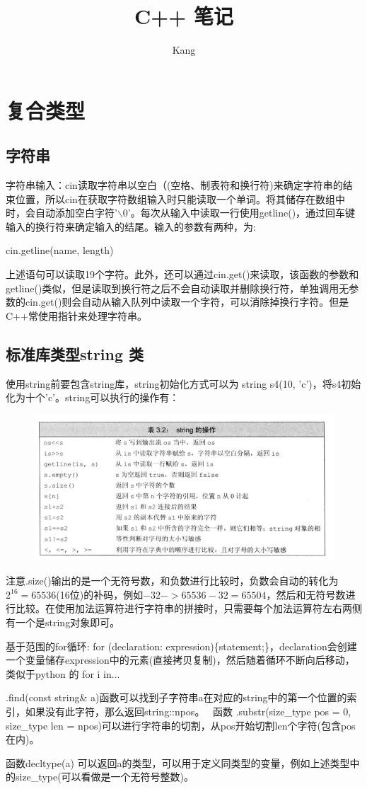 \documentclass[]{article}
\title{C++ 笔记}
\author{Kang}
\begin{document}
\maketitle
\section{复合类型}
\subsection{字符串}
    \par 字符串输入：cin读取字符串以空白（(空格、制表符和换行符)来确定字符串的结束位置，所以cin在获取字符数组输入时只能读取一个单词。将其储存在数组中时，会自动添加空白字符'$\backslash$0'。每次从输入中读取一行使用getline()，通过回车键输入的换行符来确定输入的结尾。输入的参数有两种，为:  \begin{center}
    	cin.getline(name, length)
    \end{center}
    
    上述语句可以读取19个字符。此外，还可以通过cin.get()来读取，该函数的参数和getline()类似，但是读取到换行符之后不会自动读取并删除换行符，单独调用无参数的cin.get()则会自动从输入队列中读取一个字符，可以消除掉换行字符。但是C++常使用指针来处理字符串。
\subsection{标准库类型string 类}
使用string前要包含string库，string初始化方式可以为 string s4(10, 'c')，将s4初始化为十个'c'。string可以执行的操作有：
\begin{figure}[h]
	\includegraphics*[width=1\textwidth]{picture/string.png}
\end{figure}
注意.size()输出的是一个无符号数，和负数进行比较时，负数会自动的转化为$2^16=65536$(16位)的补码，例如$-32 -> 65536-32 = 65504$，然后和无符号数进行比较。在使用加法运算符进行字符串的拼接时，只需要每个加法运算符左右两侧有一个是string对象即可。
\par 基于范围的for循环: for (declaration: expression)\{statement;\}，declaration会创建一个变量储存expression中的元素(直接拷贝复制)，然后随着循环不断向后移动，类似于python 的 for i in...
\par .find(const string\& a)函数可以找到子字符串a在对应的string中的第一个位置的索引，如果没有此字符，那么返回string::npos。 \ 函数 .substr(size\_type pos = 0, size\_type len = npos)可以进行字符串的切割，从pos开始切割len个字符(包含pos在内)。
\par 函数decltype(a) 可以返回a的类型，可以用于定义同类型的变量，例如上述类型中的size\_type(可以看做是一个无符号整数)。
\end{document}
